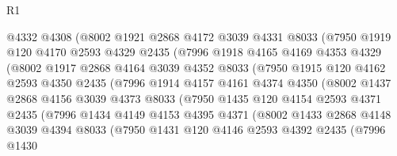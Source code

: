 \begin{lexlean}{R1}
\begin{coremodule}
                @4332
                @4308
                (@8002
                  @1921
                  @2868
                  @4172
                  @3039
                  @4331
                  @8033
                  (@7950
                    @1919
                    @120
                    @4170
                    @2593
                    @4329
                    @2435
                    (@7996
                      @1918
                      @4165
                      @4169
                      @4353
                      @4329
                      (@8002
                        @1917
                        @2868
                        @4164
                        @3039
                        @4352
                        @8033
                        (@7950
                          @1915
                          @120
                          @4162
                          @2593
                          @4350
                          @2435
                          (@7996
                            @1914
                            @4157
                            @4161
                            @4374
                            @4350
                            (@8002
                              @1437
                              @2868
                              @4156
                              @3039
                              @4373
                              @8033
                              (@7950
                                @1435
                                @120
                                @4154
                                @2593
                                @4371
                                @2435
                                (@7996
                                  @1434
                                  @4149
                                  @4153
                                  @4395
                                  @4371
                                  (@8002
                                    @1433
                                    @2868
                                    @4148
                                    @3039
                                    @4394
                                    @8033
                                    (@7950
                                      @1431
                                      @120
                                      @4146
                                      @2593
                                      @4392
                                      @2435
                                      (@7996
                                        @1430

\end{coremodule}
\end{lexlean}
